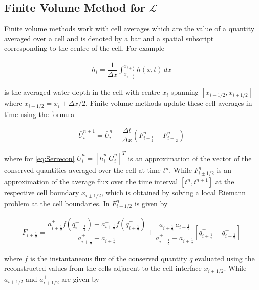 \documentclass[SingleSpace,12pt,Proceedings]{Serre_ASCE}
\begin{document}
\subsection{Finite Volume Method for $\mathcal{L}$}
\label{section:conservativeL}
Finite volume methods work with cell averages which are the value of a quantity averaged over a cell and is denoted by a bar and a spatial subscript corresponding to the centre of the cell. For example
\begin{linenomath*}
\begin{gather*}
\bar{h}_i = \dfrac{1}{\Delta x} \int_{x_{i-\frac{1}{2}}}^{x_{i+\frac{1}{2}}} h(x,t) \, dx 
\end{gather*}
\end{linenomath*}
is the averaged water depth in the cell with centre $x_i$ spanning $\left[x_{i - 1/2} , x_{i + 1/2}\right]$ where $x_{i \pm 1/2} = x_i \pm \Delta x/2$. Finite volume methods update these cell averages in time using the formula
\begin{linenomath*}
\begin{gather}\label{eq:FVMupdate}
\bar{U}^{n+1}_i = \bar{U}^{n}_i - \dfrac{\Delta t}{\Delta x} \left(F^n_{i+ \frac{1}{2}} - F^n_{i - \frac{1}{2}} \right)
\end{gather}
\end{linenomath*}
where for \eqref{eq:Serrecon} $\bar{U}^{n}_i = \left[ \bar{h}^{n}_i \; \bar{G}^{n}_i \right] ^T$ is an approximation of the vector of the conserved quantities averaged over the cell at time $t^n$. While $F^n_{i\pm 1/2}$ is an approximation of the average flux over the time interval $[t^n, t^{n+1}]$ at the respective cell boundary $x_{i \pm 1/2 }$, which is obtained by solving a local Riemann problem at the cell boundaries.  In  $F^n_{i\pm 1/2}$ is given by
\begin{linenomath*}
\begin{gather}\label{eq:HLL_flux}
F_{i+\frac{1}{2}} = \dfrac{a^+_{i+\frac{1}{2}} f\left(q^-_{i+\frac{1}{2}}\right) - a^-_{i+\frac{1}{2}} f\left(q^+_{i+\frac{1}{2}}\right)}{a^+_{i+\frac{1}{2}} - a^-_{i+\frac{1}{2}}}  + \dfrac{a^+_{i+\frac{1}{2}} \, a^-_{i+\frac{1}{2}}}{a^+_{i+\frac{1}{2}} - a^-_{i+\frac{1}{2}}} \left [ q^+_{i+\frac{1}{2}} - q^-_{i+\frac{1}{2}} \right ]
\end{gather}
\end{linenomath*}
where $f$ is the instantaneous flux of the conserved quantity $q$ evaluated using the reconstructed values from the cells adjacent to the cell interface $x_{i + 1/2}$. While $a^-_{i+1/2}$ and $a^+_{i+1/2}$ are given by
\end{document}
